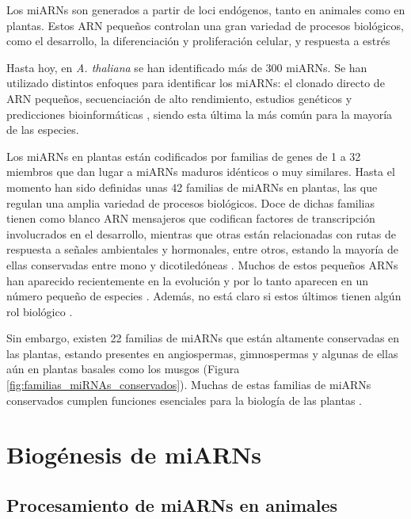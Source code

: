 Los miARNs son generados a partir de loci endógenos, tanto en animales como en plantas. 
Estos ARN pequeños controlan una gran variedad de procesos biológicos, como el desarrollo, la diferenciación y proliferación celular, y respuesta a estrés \citep{Voinnet2009669,pmid25118717,citeulike:8816489,pmid12869753,Axtell2008}

Hasta hoy, en \textit{A. thaliana} se han identificado más de 300 \citep{Kozomara2014} miARNs.
Se han utilizado distintos enfoques para identificar los miARNs: el clonado directo de ARN pequeños, secuenciación de alto rendimiento, estudios genéticos y predicciones bioinformáticas \citep{citeulike:8816489}, siendo esta última la más común para la mayoría de las especies.

Los miARNs en plantas están codificados por familias de genes de 1 a 32 miembros que dan lugar a miARNs maduros idénticos o muy similares.
Hasta el momento han sido definidas unas 42 familias de miARNs en plantas, las que regulan una amplia variedad de procesos biológicos.
Doce de dichas familias tienen como blanco ARN mensajeros que codifican factores de transcripción involucrados en el desarrollo, mientras que otras están relacionadas con rutas de respuesta a señales ambientales y hormonales, entre otros, estando la mayoría de ellas conservadas entre mono y dicotiledóneas \citep{Jones-Rhoades2006}.
Muchos de estos pequeños ARNs han aparecido recientemente en la evolución y por lo tanto aparecen en un número pequeño de especies \citep{Axtell2008,Axtell2008343}.
Además, no está claro si estos últimos tienen algún rol biológico \citep{Axtell2008343,citeulike:8816489}.

Sin embargo, existen 22 familias de miARNs que están altamente conservadas en las plantas, estando presentes en angiospermas, gimnospermas y algunas de ellas aún en plantas basales como los musgos \citep{Axtell2008,Arazi2005,pmid16623887} (Figura \ref{fig:familias_miRNAs_conservados}).
Muchas de estas familias de miARNs conservados cumplen funciones esenciales para la biología de las plantas \citep{Jones-Rhoades2006}.


\section{Biogénesis de miARNs}

\subsection{Procesamiento de miARNs en animales}

